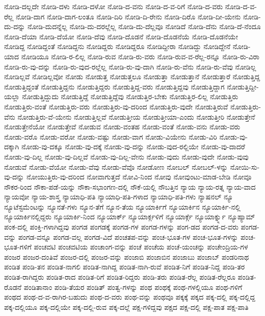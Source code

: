 {ನೋಡಿ-ದಲ್ಲದೇ
ನೋಡಿ-ದಳು
ನೋಡಿ-ದಳೋ
ನೋಡಿ-ದ-ವನು
ನೋಡಿ-ದ-ವ-ರಿಗೆ
ನೋಡಿ-ದ-ವರು
ನೋಡಿ-ದ-ವ-ರೆಲ್ಲ
ನೋಡಿ-ದಾಗ
ನೋಡಿ-ದಾಗ-ಲಂತೂ
ನೋಡಿ-ದಿರಿ
ನೋಡಿ-ದಿ-ರೇನು
ನೋಡಿ-ದಿರೊ
ನೋಡಿ-ದೀ-ಯೇನು
ನೋಡಿ-ದು-ದನ್ನು
ನೋಡಿ-ದುದನ್ನೆಲ್ಲ
ನೋಡಿ-ದು-ದರಲ್ಲೆಲ್ಲ
ನೋಡಿ-ದು-ದೆಲ್ಲವೂ
ನೋಡಿದೆ
ನೋಡಿ-ದೆನು
ನೋಡಿ-ದೆ-ನೆಂದೂ
ನೋಡಿ-ದೆಯಾ
ನೋಡಿ-ದೆಯೋ
ನೋಡಿ-ದೆವು
ನೋಡಿ-ದೊಡನೆ
ನೋಡಿ-ದೊಡನೆಯೆ
ನೋಡಿ-ದೊಡನೆಯೇ
ನೋಡಿದ್ದ
ನೋಡಿದ್ದಂತೆ
ನೋಡಿದ್ದನು
ನೋಡಿದ್ದರು
ನೋಡಿದ್ದರೂ
ನೋಡಿದ್ದೀರಾ
ನೋಡಿದ್ದು
ನೋಡಿದ್ದೇನೆ
ನೋಡಿ-ಯಾದ
ನೋಡಿಯೂ
ನೋಡಿ-ರ-ಲಿಲ್ಲ
ನೋಡಿ-ರುವ
ನೋಡಿ-ರು-ವರು
ನೋಡಿ-ರುವ-ವ-ರೆಲ್ಲ-ರನ್ನೂ
ನೋಡಿ-ರು-ವಿರಾ
ನೋಡಿ-ರು-ವು-ದನ್ನು
ನೋಡಿ-ರು-ವುದ-ರಲ್ಲೆಲ್ಲ
ನೋಡಿ-ರು-ವು-ದಾಗಿ
ನೋಡಿ-ರು-ವೆನು
ನೋಡಿ-ರು-ವೆವು
ನೋಡಿಲ್ಲ
ನೋಡಿಲ್ಲವೆ
ನೋಡಿಲ್ಲವೋ
ನೋಡು
ನೋಡುತ್ತ
ನೋಡುತ್ತಲೂ
ನೋಡುತ್ತಾ
ನೋಡುತ್ತಾನೆ
ನೋಡುತ್ತಾರೆ
ನೋಡುತ್ತಿದ್ದ
ನೋಡುತ್ತಿದ್ದಂತೆ
ನೋಡುತ್ತಿದ್ದನು
ನೋಡುತ್ತಿದ್ದರು
ನೋಡುತ್ತಿದ್ದ-ವರು
ನೋಡುತ್ತಿದ್ದವು
ನೋಡುತ್ತಿದ್ದಾಗ
ನೋಡುತ್ತಿದ್ದೀ-ಯಲ್ಲಾ
ನೋಡುತ್ತಿದ್ದುದು
ನೋಡುತ್ತಿದ್ದೆ
ನೋಡುತ್ತಿದ್ದೆವು
ನೋಡುತ್ತಿರ-ಬೇಕು
ನೋಡುತ್ತಿರ-ಲಿಲ್ಲ
ನೋಡುತ್ತಿರು
ನೋಡುತ್ತಿರು-ವಂತೆ
ನೋಡುತ್ತಿರು-ವರು
ನೋಡುತ್ತಿರು-ವು-ದರಿಂದ
ನೋಡುತ್ತಿರು-ವುದೇ
ನೋಡುತ್ತಿರುವೆ
ನೋಡುತ್ತಿರು-ವೆನು
ನೋಡುತ್ತಿರು-ವೆ-ಯೇನು
ನೋಡುತ್ತಿಲ್ಲವೆ
ನೋಡುತ್ತೀಯ
ನೋಡುತ್ತೀಯಾ-ಎಂದು
ನೋಡುತ್ತೀರಿ
ನೋಡುತ್ತೇನೆ
ನೋಡುತ್ತೇನೆಯೋ
ನೋಡುತ್ತೇವೆ
ನೋಡುವ
ನೋಡು-ವಂತಹ
ನೋಡು-ವಂತೆ
ನೋಡು-ವನು
ನೋಡು-ವರು
ನೋಡು-ವರೊ
ನೋಡು-ವರೋ
ನೋಡು-ವಷ್ಟು
ನೋಡು-ವಾಗ
ನೋಡು-ವಿಯೇನು
ನೋಡು-ವಿರಿ
ನೋಡು-ವು-ದಕ್ಕಾಗಿ
ನೋಡು-ವು-ದಕ್ಕೂ
ನೋಡು-ವು-ದಕ್ಕೆ
ನೋಡು-ವು-ದನ್ನು
ನೋಡು-ವುದ-ರಲ್ಲಿಯೇ
ನೋಡು-ವು-ದಾದರೆ
ನೋಡು-ವು-ದಿಲ್ಲ
ನೋಡು-ವು-ದಿಲ್ಲವೆ
ನೋಡು-ವು-ದಿಲ್ಲ-ವೇನು
ನೋಡು-ವುದು
ನೋಡು-ವುದೇ
ನೋಡು-ವುವು
ನೋಡುವೆ
ನೋಡು-ವೆಯೋ
ನೋಡು-ವೆವು
ನೋಡು-ವೆವೊ
ನೋಡೋಣ
ನೋಬಲ್
ನೋಬಲ್-ಳನ್ನು
ನೋಯಿ-ಸು-ವು-ದನ್ನು
ನೋಯುತ್ತಿರು-ವು-ದರಿಂದ
ನೋವಾಗುತ್ತದೆ
ನೋವಿ-ನಿಂದ
ನೋವು
ನೋವುಂಟು-ಮಾಡ-ಬೇಡಿ
ನೋವೂ
ನೌಕರ-ರಿಂದ
ನೌಕಾ-ಪಡೆ-ಯನ್ನು
ನೌಕಾ-ಸಭಾಂಗಣ-ದಲ್ಲಿ
ನೌಕೆ-ಯಲ್ಲಿ
ನೌಬತ್ತಿನ
ನ್ಯಾಯ
ನ್ಯಾಯ-ರತ್ನ
ನ್ಯಾಯ-ವಾದ
ನ್ಯಾಯವೋ
ನ್ಯಾಯ-ಶಾಸ್ತ್ರ
ನ್ಯಾಯಾಧಿ-ಪತಿ
ನ್ಯಾಯಾಧಿ-ಪತಿ-ಗಳಾದ
ನ್ಯಾಯಾಧಿ-ಪತಿ-ಗಳು
ನ್ಯಾಷನಲ್
ನ್ಯೂ
ನ್ಯೂಟೆಸ್ಟಮೆಂಟನ್ನು
ನ್ಯೂನತೆ-ಗಳು
ನ್ಯೂನ-ತೆಗೆ
ನ್ಯೂನ-ತೆಯ
ನ್ಯೂಯಾರ್ಕಿಗೆ
ನ್ಯೂಯಾರ್ಕಿನ
ನ್ಯೂಯಾರ್ಕಿ-ನಲ್ಲಿ
ನ್ಯೂಯಾರ್ಕಿನಲ್ಲಿದ್ದರು
ನ್ಯೂಯಾರ್ಕಿ-ನಿಂದ
ನ್ಯೂಯಾರ್ಕ್
ನ್ಯೂಯಾರ್ಕ್ಗಳಿಗೆ
ನ್ಯೂಯಾರ್ಕ್ಗೆ
ನ್ಯೂಯಾರ್ಕ್ನ್ನು
ನ್ಯೂಹ್ಯಾಮ್
ಪಂಕ-ದಲ್ಲಿ
ಪಂಕ್ತಿ-ಗಳಾಗಿದ್ದವು
ಪಂಗಡ
ಪಂಗಡಕ್ಕೆ
ಪಂಗಡ-ಗಳ
ಪಂಗಡ-ಗಳನ್ನು
ಪಂಗ-ಡದ
ಪಂಗಡ-ದ-ವರು
ಪಂಗಡ-ವನ್ನು
ಪಂಗಡ-ವನ್ನೂ
ಪಂಗಡ-ವಲ್ಲ
ಪಂಗಡ-ವಿದೆ
ಪಂಚತಪ-ವನ್ನು
ಪಂಚ-ಭೂತ-ಗಳ
ಪಂಚ-ಭೂತ-ಗಳನ್ನು
ಪಂಚ-ಭೂತ-ಗಳಿಗೆ
ಪಂಚವಟಿ
ಪಂಚವಟಿಯ
ಪಂಚಾಂಗ-ವನ್ನು
ಪಂಚೆ
ಪಂಚೆಯ
ಪಂಚೆ-ಯಂಚನ್ನು
ಪಂಚೇಂದ್ರಿಯ-ಗಳ
ಪಂಜರ
ಪಂಜರ-ದಂತಿವೆ
ಪಂಜರ-ದಲ್ಲಿ
ಪಂಜರ-ವನ್ನು
ಪಂಜಾಬಿ
ಪಂಜಾಬಿನ
ಪಂಜಾಬು
ಪಂಜಾಬ್
ಪಂಡರಿನಾಥ
ಪಂಡಿತ
ಪಂಡಿ-ತನ
ಪಂಡಿತ-ನಾಗಲಿ
ಪಂಡಿತ-ನಾಗಿದ್ದ
ಪಂಡಿತ-ನಾಗಿ-ರುವೆ
ಪಂಡಿತ-ನಿಗೆ
ಪಂಡಿತ-ನಿದ್ದ
ಪಂಡಿ-ತರ
ಪಂಡಿತ-ರಾಗಿದ್ದರು
ಪಂಡಿತ-ರಾದ
ಪಂಡಿತ-ರಿಗೆ
ಪಂಡಿತ-ರಿದ್ದರು
ಪಂಡಿ-ತರು
ಪಂಡಿತ-ರೆಲ್ಲ
ಪಂಡಿತ-ರೆಲ್ಲರೂ
ಪಂಡಿತ-ರೊಡನೆ
ಪಂಡಿತಾನಾಂ
ಪಂಡಿ-ತೆಯರ
ಪಂಡಿತ್
ಪಂತ್ವ-ಗಳನ್ನು
ಪಂಥ
ಪಂಥಕ್ಕೆ
ಪಂಥ-ಗಳಲ್ಲಿಯೂ
ಪಂಥ-ಗಳಿಗೆ
ಪಂಥದ
ಪಂಥ-ದ-ವ-ರಾಗಿರ-ಬಹುದು
ಪಂಥ-ದ-ವರು
ಪಂಥ-ವನ್ನು
ಪಂಥವೂ
ಪಕ್ಕಕ್ಕೆ
ಪಕ್ಕದ
ಪಕ್ಕ-ದಲ್ಲಿ
ಪಕ್ಕ-ದಲ್ಲಿದ್ದ
ಪಕ್ಕ-ದಲ್ಲಿಯೂ
ಪಕ್ಕ-ದಲ್ಲಿಯೇ
ಪಕ್ಕ-ದಲ್ಲಿ-ರುವ
ಪಕ್ಕ-ದಲ್ಲೆ
ಪಕ್ಷ-ಗಳಿದ್ದವು
ಪಕ್ಷದ
ಪಕ್ಷ-ದಲ್ಲಿ
ಪಕ್ಷ-ಪಾತ
ಪಕ್ಷ-ಪಾತಿ
}
